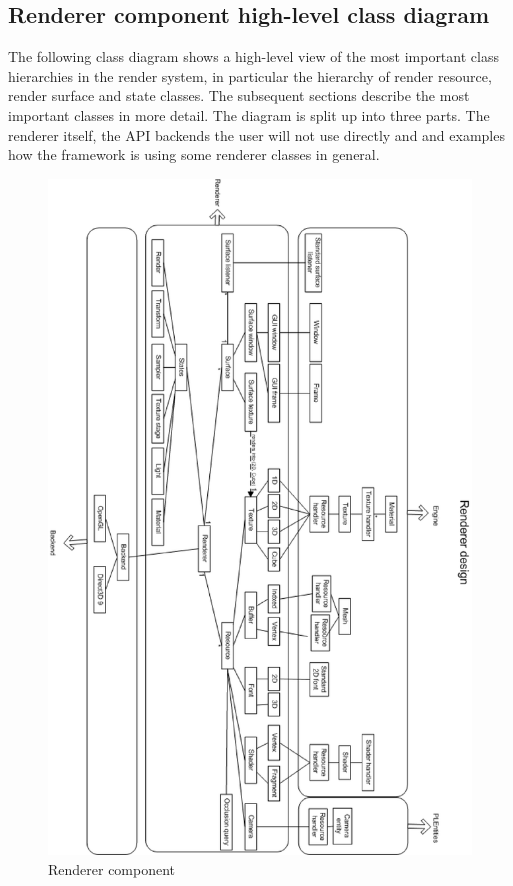 \subsection{Renderer component high-level class diagram}
The following class diagram shows a high-level view of the most important class hierarchies in the render system, in particular the hierarchy of render resource, render surface and state classes. The subsequent sections describe the most important classes in more detail. The diagram is split up into three parts. The renderer itself, the API backends the user will not use directly and and examples how the framework is using some renderer classes in general.

\begin{figure}
  \centering
  \includegraphics[scale=0.7]{pics/PLRendererClassDiagram.eps}
  \caption{Renderer component}
  \label{fig:Renderer component high-level class diagram}
\end{figure}




